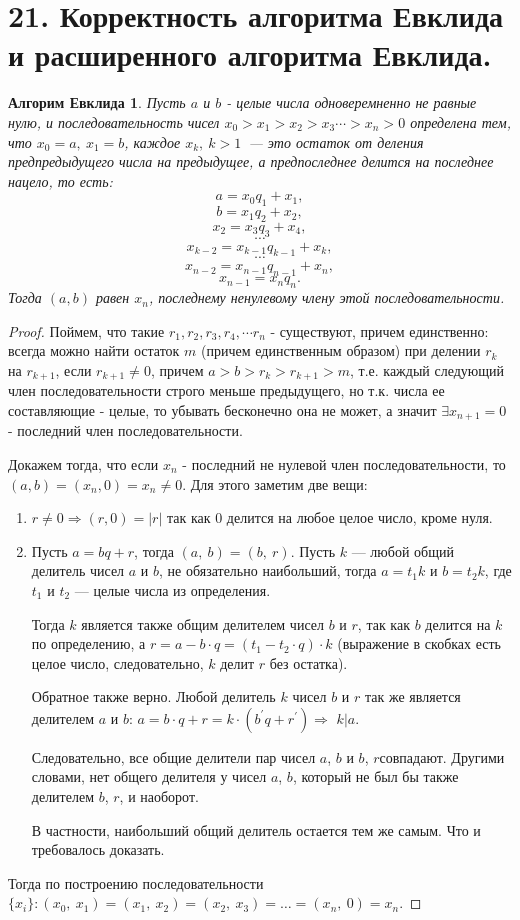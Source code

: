 \documentclass[a4paper,12pt]{article}
\newtheorem*{Evc} {Алгорим Евклида}
\newcommand{\p}{^{\prime}}
\begin{document}
		\section*{21. Корректность алгоритма Евклида и расширенного алгоритма Евклида.}
		\begin{Evc}
		Пусть $a$ и $b$ - целые числа одноверемненно не равные нулю, и последовательность чисел
		$ x_0 > x_1 > x_2 > x_3 \cdots > x_n > 0$
		определена тем, что $x_0 = a,\ x_1 = b$, каждое $x_k,\ k > 1$ — это остаток от деления предпредыдущего числа на предыдущее, а предпоследнее делится на последнее нацело, то есть:
		$$a = x_0q_1 + x_1,$$
		$$b = x_1q_2 + x_2,$$
		$$x_2 = x_3q_3 + x_4,$$
		$$\cdots$$
		$$x_{k-2} = x_{k-1} q_{k-1} + x_k,$$	 
		$$\cdots$$
		$$x_{n-2} = x_{n-1}q_{n-1}+ x_n,$$
		$$x_{n-1} = x_n q_n.$$
		Тогда $(a, b)$ равен $x_n$, последнему ненулевому члену этой последовательности.
		\end{Evc}
		\begin{proof}
			Поймем, что такие $r_1, r_2, r_3, r_4, \cdots r_n$ - существуют, причем единственно: всегда можно найти остаток $m$ (причем единственным образом) при делении $r_k$ на $r_{k + 1}$, если $r_{k + 1} \ne 0$, причем $a > b > r_k > r_{k + 1} > m$, т.е. каждый следующий член последовательности строго меньше предыдущего, но т.к. числа ее составляющие - целые, то убывать бесконечно она не может, а значит $\exists x_{n + 1} = 0$ - последний член последовательности.

			Докажем тогда, что если $x_n$ - последний не нулевой член последовательности, то $(a, b) = (x_n, 0) = x_n \ne 0$. Для этого заметим две вещи:
			\begin{enumerate}
				\item $r \ne 0 \Rightarrow (r, 0) = |r|$ так как 0 делится на любое целое число, кроме нуля.

				\item Пусть $a = bq + r$, тогда $(a,\ b) = (b,\ r)$.
				Пусть $k$ — любой общий делитель чисел $a$ и $b$, не обязательно наибольший, тогда $a = t_1k$ и $b = t_2k$, где $t_1$ и $t_2$ — целые числа из определения.

				Тогда $k$ является также общим делителем чисел $b$ и $r$, так как $b$ делится на $k$ по определению, а $r = a - b\cdot q = (t_1 - t_2\cdot q)\cdot k$ (выражение в скобках есть целое число, следовательно, $k$ делит $r$ без остатка). 
				
				Обратное также верно. Любой делитель $k$ чисел $b$ и $r$ так же является делителем $a$ и $b$: $a = b \cdot q + r = k\cdot (b\p q + r\p)$$\Rightarrow$ $k|a$.
				
				Следовательно, все общие делители пар чисел $a$, $b$ и $b$, $r$совпадают. Другими словами, нет общего делителя у чисел $a$, $b$, который не был бы также делителем $b$, $r$, и наоборот.
				
				В частности, наибольший общий делитель остается тем же самым. Что и требовалось доказать.
			\end{enumerate}

			Тогда по построению последовательности $\{x_i\}: (x_0,\ x_1) = (x_1,\ x_2) = (x_2,\ x_3) = \ldots = (x_n,\ 0) = x_n$.
		\end{proof}
\end{document}
